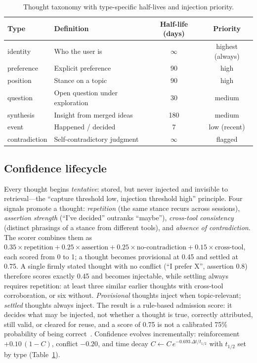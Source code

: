 \documentclass[11pt]{article}
\begin{document}
\begin{table}[!htbp]
  \centering
  \caption{Thought taxonomy with type-specific half-lives and injection priority.}
  \label{tab:thought_types}
  \begin{tabular}{llcc}
    \toprule
    \textbf{Type} & \textbf{Definition} & \textbf{Half-life (days)} & \textbf{Priority} \\
    \midrule
    identity      & Who the user is                 & $\infty$ & highest (always) \\
    preference    & Explicit preference             & 90       & high \\
    position      & Stance on a topic               & 90       & high \\
    question      & Open question under exploration & 30       & medium \\
    synthesis     & Insight from merged ideas       & 180      & medium \\
    event         & Happened / decided              & 7        & low (recent) \\
    contradiction & Self-contradictory judgment     & $\infty$ & flagged \\
    \bottomrule
  \end{tabular}
\end{table}

\subsection{Confidence lifecycle}
\label{sec:lifecycle}

Every thought begins \emph{tentative}: stored, but never injected and
invisible to retrieval---the ``capture threshold low, injection threshold
high'' principle. Four signals promote a thought: \emph{repetition} (the
same stance recurs across sessions), \emph{assertion strength} (``I've
decided'' outranks ``maybe''), \emph{cross-tool consistency} (distinct
phrasings of a stance from different tools), and \emph{absence of
contradiction}. The scorer combines them as
$0.35 \times \text{repetition} + 0.25 \times \text{assertion} + 0.25 \times
\text{no-contradiction} + 0.15 \times \text{cross-tool}$, each scored from 0
to 1; a thought becomes provisional at 0.45 and settled at 0.75. A single
firmly stated thought with no conflict (``I prefer X'', assertion 0.8)
therefore scores exactly 0.45 and becomes injectable, while settling always
requires repetition: at least three similar earlier thoughts with cross-tool
corroboration, or six without. \emph{Provisional} thoughts inject when
topic-relevant; \emph{settled} thoughts always inject. The result is a
rule-based admission score: it decides what may be injected, not whether a
thought is true, correctly attributed, still valid, or cleared for reuse, and a score of 0.75 is not a calibrated 75\% probability of
being correct~\citep{guo2017calibration}. Confidence evolves
incrementally: reinforcement $+0.10\,(1-C)$, conflict $-0.20$, and time decay
$C \leftarrow C\, e^{-0.693\,\Delta t / t_{1/2}}$ with $t_{1/2}$ set by type
(Table~\ref{tab:thought_types}).
\end{document}
